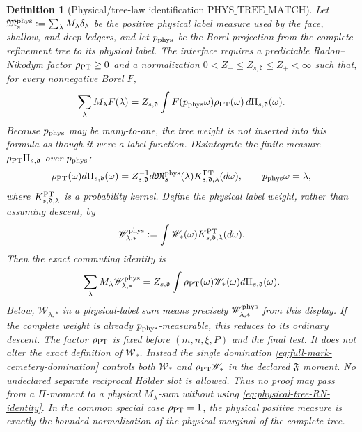 \documentclass[11pt]{article}
\newtheorem{definition}[theorem]{Definition}
\begin{document}
\begin{definition}[Physical/tree-law identification
$\mathrm{PHYS\_TREE\_MATCH}$]
\label{def:physical-tree-match}
Let $\mathfrak M_s^{\rm phys}:=\sum_\lambda M_\lambda\delta_\lambda$
be the positive physical label measure used by the face, shallow, and deep
ledgers, and let $p_{\rm phys}$ be the Borel projection from the complete
refinement tree to its physical label.  The interface requires a predictable
Radon--Nikodym factor $\rho_{\rm PT}\ge0$ and a normalization
$0<Z_-\le Z_{s,\mathfrak d}\le Z_+<\infty$ such that, for every nonnegative
Borel $F$,
\begin{equation}
\label{eq:physical-tree-RN-identity}
 \sum_\lambda M_\lambda F(\lambda)
 =Z_{s,\mathfrak d}\int
   F(p_{\rm phys}\omega)\rho_{\rm PT}(\omega)
       \,d\Pi_{s,\mathfrak d}(\omega).
\end{equation}
Because $p_{\rm phys}$ may be many-to-one, the tree weight is not inserted
into this formula as though it were a label function.  Disintegrate the
finite measure $\rho_{\rm PT}\Pi_{s,\mathfrak d}$ over $p_{\rm phys}$:
\begin{equation}
\label{eq:physical-weight-fibre-disintegration}
 \rho_{\rm PT}(\omega)d\Pi_{s,\mathfrak d}(\omega)
 =Z_{s,\mathfrak d}^{-1}
   d\mathfrak M_s^{\rm phys}(\lambda)
   K_{s,\mathfrak d,\lambda}^{\rm PT}(d\omega),
 \qquad p_{\rm phys}\omega=\lambda,
\end{equation}
where $K_{s,\mathfrak d,\lambda}^{\rm PT}$ is a probability kernel.  Define
the physical label weight, rather than assuming descent, by
\begin{equation}
\label{eq:physical-weight-conditional-definition}
 \mathscr W_{\lambda,*}^{\rm phys}
 :=\int\mathscr W_*(\omega)
      K_{s,\mathfrak d,\lambda}^{\rm PT}(d\omega).
\end{equation}
Then the exact commuting identity is
\begin{equation}
\label{eq:physical-weight-RN-identity}
 \sum_\lambda M_\lambda\mathscr W_{\lambda,*}^{\rm phys}
 =Z_{s,\mathfrak d}\int\rho_{\rm PT}(\omega)\mathscr W_*(\omega)
       d\Pi_{s,\mathfrak d}(\omega).
\end{equation}
Below, $\mathscr W_{\lambda,*}$ in a physical-label sum means precisely
$\mathscr W_{\lambda,*}^{\rm phys}$ from this display.  If the complete
weight is already $p_{\rm phys}$-measurable, this reduces to its ordinary
descent.
The factor $\rho_{\rm PT}$ is fixed before $(m,n,\xi,P)$ and the final test.
It does not alter the exact definition of $\mathscr W_*$.  Instead the
single domination \eqref{eq:full-mark-cemetery-domination} controls both
$\mathscr W_*$ and $\rho_{\rm PT}\mathscr W_*$ in the declared
$\mathfrak F$ moment.  No undeclared separate reciprocal H\"older slot is
allowed.  Thus no proof may pass from a
$\Pi$-moment to a physical $M_\lambda$-sum without using
\eqref{eq:physical-tree-RN-identity}.  In the common special case
$\rho_{\rm PT}=1$, the physical positive measure is exactly the bounded
normalization of the physical marginal of the complete tree.
\end{definition}
\end{document}
